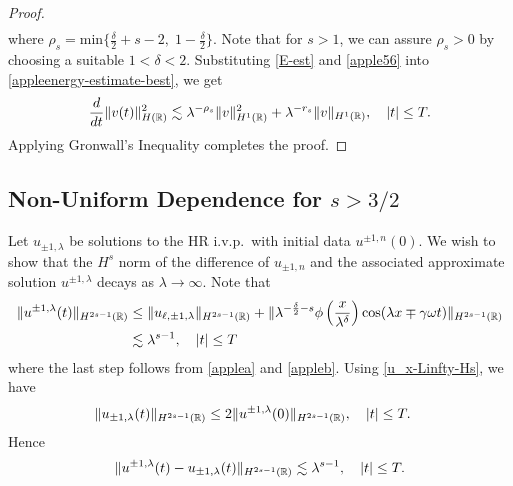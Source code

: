\begin{proof}
\begin{equation}
\begin{split}
\label{apple56}
\end{split}
\end{equation}
%
%
where $\rho_s = \text{min} \Big\{ \frac{\delta}{2} + s -2, \; 1-
\frac{\delta}{2} \Big\}$.  Note that for $s>1$, we can assure $\rho_s > 0$
by choosing a suitable $1<\delta<2$.
Substituting \eqref{E-est} and \eqref{apple56} into \eqref{appleenergy-estimate-best},
we get
%
%
\begin{equation}
\label{apple58}
\frac{d}{dt} \|v(t)\|_{H(\mathbb{R})}^2 \lesssim \lambda^{-\rho_s}
\|v\|_{H^1(\mathbb{R})}^2 + \lambda^{-r_s}
\|v \|_{H^1(\mathbb{R})}, \quad |t| \le T.
\end{equation}
%
%
Applying Gronwall's Inequality completes the proof. 
\end{proof}
%
%
%
%

\subsection{Non-Uniform Dependence for $s>3/2$}
Let $u_{\pm 1,\lambda}$ be solutions to the HR i.v.p.\ with initial 
data $u^{\pm 1,
n}(0)$. We wish to show that the $H^s$ norm of the difference of $u_{\pm 1,
n}$ and the associated approximate solution $u^{\pm 1,\lambda}$
decays as $\lambda \to \infty$. Note that
%
%
\begin{equation*}
\begin{split}
\label{apple62}
\|u^{\pm 1, \lambda}(t)\|_{H^{2s-1}(\mathbb{R})}
& \le \|u_{\ell, \pm 1, \lambda}\|_{H^{2s-1}(\mathbb{R})} +
\| \lambda^{-\frac{\delta}{2} -s} \phi \left(
\frac{x}{\lambda^\delta} \right) \cos(\lambda x \mp \gamma \omega t)
\|_{H^{2s-1}(\mathbb{R})}
\\
& \lesssim \lambda^{s-1}, \quad |t| \le T
\end{split}
\end{equation*}
%
%
where the last step follows from \cref{applea} and \cref{appleb}.
Using \eqref{u_x-Linfty-Hs}, we have 
%
\begin{equation*}
\begin{split}
\|u_{\pm 1,\lambda} (t) \|_{H^{2s-1}(\mathbb{R})}
& \le 2 \|u^{\pm 1,\lambda}(0) \|_{H^{2s-1}(\mathbb{R})}, \quad
|t| \le T.
\label{apple60}
\end{split}
\end{equation*}
%
%
%
%
Hence
%
\begin{equation}
\begin{split}
\|u^{\pm 1, \lambda}(t) - u_{\pm 1, \lambda}(t) \|_{H^{2s-1}(\mathbb{R})}
\lesssim \lambda^{s-1}, \quad |t| \le T.
\label{apple63}
\end{split}
\end{equation}
